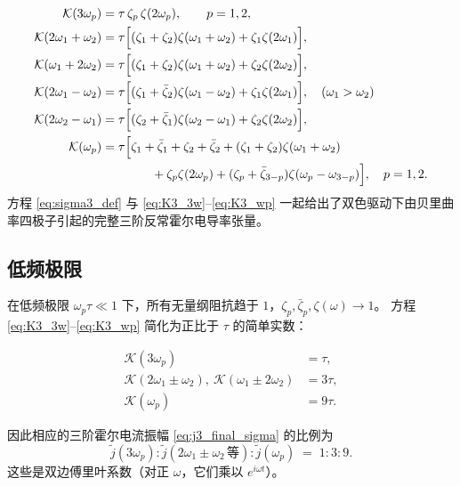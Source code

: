 \begin{align}
\mathcal{K}(3\omega_p) &= \tau\,\zeta_p\,\zeta(2\omega_p), \qquad p=1,2, \label{eq:K3_3w}\\
\mathcal{K}(2\omega_1+\omega_2) &= \tau\Big[ (\zeta_1+\zeta_2)\zeta(\omega_1+\omega_2) + \zeta_1\zeta(2\omega_1) \Big], \label{eq:K3_2w1pw2}\\
\mathcal{K}(\omega_1+2\omega_2) &= \tau\Big[ (\zeta_1+\zeta_2)\zeta(\omega_1+\omega_2) + \zeta_2\zeta(2\omega_2) \Big], \label{eq:K3_w1p2w2}\\
\mathcal{K}(2\omega_1-\omega_2) &= \tau\Big[ (\zeta_1+\bar\zeta_2)\zeta(\omega_1-\omega_2) + \zeta_1\zeta(2\omega_1) \Big], \quad (\omega_1>\omega_2) \label{eq:K3_2w1mw2}\\
\mathcal{K}(2\omega_2-\omega_1) &= \tau\Big[ (\zeta_2+\bar\zeta_1)\zeta(\omega_2-\omega_1) + \zeta_2\zeta(2\omega_2) \Big], \label{eq:K3_2w2mw1}\\
\mathcal{K}(\omega_p) &= \tau\Big[ \zeta_1+\bar\zeta_1+\zeta_2+\bar\zeta_2 + (\zeta_1+\zeta_2)\zeta(\omega_1+\omega_2) \notag\\
&\qquad\qquad + \zeta_p\zeta(2\omega_p) + (\zeta_p+\bar\zeta_{3-p})\zeta(\omega_p-\omega_{3-p}) \Big], \quad p=1,2. \label{eq:K3_wp}
\end{align}
方程 \eqref{eq:sigma3_def} 与 \eqref{eq:K3_3w}--\eqref{eq:K3_wp} 一起给出了双色驱动下由贝里曲率四极子引起的完整三阶反常霍尔电导率张量。

\subsection{低频极限}

在低频极限 \(\omega_p\tau\ll 1\) 下，所有无量纲阻抗趋于 \(1\)，\(\zeta_p,\bar\zeta_p,\zeta(\omega)\to 1\)。  
方程 \eqref{eq:K3_3w}--\eqref{eq:K3_wp} 简化为正比于 \(\tau\) 的简单实数：

\begin{align*}
\mathcal{K}(3\omega_p) &= \tau, \\
\mathcal{K}(2\omega_1\pm\omega_2),\ \mathcal{K}(\omega_1\pm 2\omega_2) &= 3\tau, \\
\mathcal{K}(\omega_p) &= 9\tau.
\end{align*}

因此相应的三阶霍尔电流振幅 \eqref{eq:j3_final_sigma} 的比例为
\[
\tilde j(3\omega_p) : \tilde j(2\omega_1\pm\omega_2\,\text{等}) : \tilde j(\omega_p) \;=\; 1 : 3 : 9 .
\]
这些是双边傅里叶系数（对正 \(\omega\)，它们乘以 \(e^{i\omega t}\)）。

